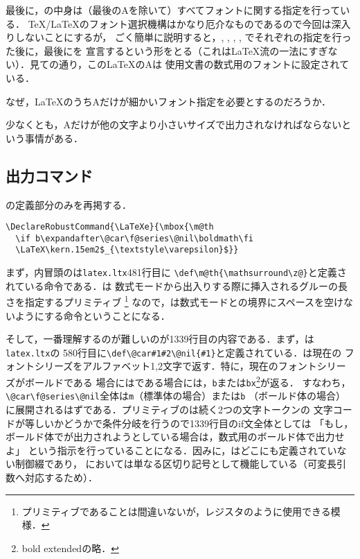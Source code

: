 \documentclass[autodetect-engine,dvipdfmx]{jsarticle}
\begin{document}
最後に，の中身は（最後のAを除いて）すべてフォントに関する指定を行っている．
\TeX/\LaTeX のフォント選択機構はかなり厄介なものであるので今回は深入りしないことにするが，
ごく簡単に説明すると，, , , 
, でそれぞれの指定を行った後に，最後にを
宣言するという形をとる（これは\LaTeX 流の一法にすぎない）．見ての通り，この\LaTeX のAは
使用文書の数式用のフォントに設定されている．

\begin{question}
なぜ，\LaTeX のうちAだけが細かいフォント指定を必要とするのだろうか．
\end{question}
\begin{answer}
少なくとも，Aだけが他の文字より小さいサイズで出力されなければならないという事情がある．
\end{answer}

\newpage

\subsection{\LaTeXe 出力コマンド}

の定義部分のみを再掲する．

\begin{lstlisting}[firstnumber=1338]
\DeclareRobustCommand{\LaTeXe}{\mbox{\m@th
  \if b\expandafter\@car\f@series\@nil\boldmath\fi
  \LaTeX\kern.15em2$_{\textstyle\varepsilon}$}}
\end{lstlisting}

まず，内冒頭のは\texttt{latex.ltx}481行目に
\verb|\def\m@th{\mathsurround\z@}|と定義されている命令である．は
数式モードから出入りする際に挿入されるグルーの長さを指定するプリミティブ
\footnote{プリミティブであることは間違いないが，レジスタのように使用できる模様．}
なので，は数式モードとの境界にスペースを空けないようにする命令ということになる．

そして，一番理解するのが難しいのが1339行目の内容である．まず，は\texttt{latex.ltx}の
580行目に\verb|\def\@car#1#2\@nil{#1}|と定義されている．は現在の
フォントシリーズをアルファベット1,2文字で返す．特に，現在のフォントシリーズがボールドである
場合にはである場合には，\texttt{b}または\texttt{bx}\footnote{bold extendedの略．}が返る．
すなわち，\verb|\@car\f@series\@nil|全体は\texttt{m}（標準体の場合）または\texttt{b}
（ボールド体の場合）に展開されるはずである．プリミティブのは続く2つの文字トークンの
文字コードが等しいかどうかで条件分岐を行うので1339行目のif文全体としては
「もし，ボールド体で\LaTeXe が出力されようとしている場合は，数式用のボールド体で出力せよ」
という指示を行っていることになる．因みに，はどこにも定義されていない制御綴であり，
においては単なる区切り記号として機能している（可変長引数へ対応するため）．
\end{document}
